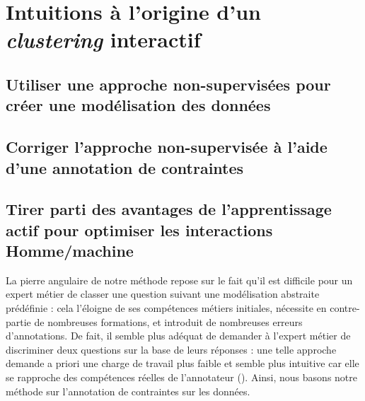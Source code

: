 \section{Intuitions à l'origine d'un \textit{clustering} interactif}
\label{section:3.1-INTUITIONS-ORIGINES}


	


	\subsection{Utiliser une approche non-supervisées pour créer une modélisation des données}
	\label{section:3.1.1-INTUITIONS-ORIGINES-NON-SUPERVISEES}
	
	
	\subsection{Corriger l'approche non-supervisée à l'aide d'une annotation de contraintes}
	\label{section:3.1.2-INTUITIONS-ORIGINES-SEMI-SUPERVISEES}
	
	
	\subsection{Tirer parti des avantages de l'apprentissage actif pour optimiser les interactions Homme/machine}
	\label{section:3.1.3-INTUITIONS-ORIGINES-APPRENTISSAGE-ACTIF}
	


	La pierre angulaire de notre méthode repose sur le fait qu'il est difficile pour un expert métier de classer une question suivant une modélisation abstraite prédéfinie :
	cela l'éloigne de ses compétences métiers initiales, nécessite en contre-partie de nombreuses formations, et introduit de nombreuses erreurs d'annotations.
	De fait, il semble plus adéquat de demander à l'expert métier de discriminer deux questions sur la base de leurs réponses :
	une telle approche demande a priori une charge de travail plus faible et semble plus intuitive car elle se rapproche des compétences réelles de l'annotateur ().
	Ainsi, nous basons notre méthode sur l'annotation de contraintes sur les données.
	
